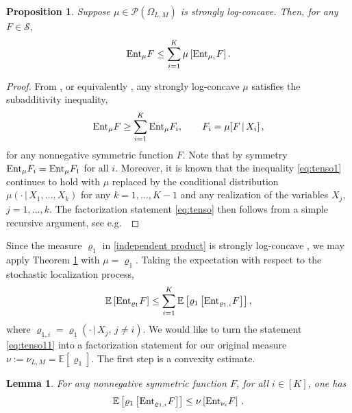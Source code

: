 \documentclass[11pt,reqno]{amsart}
\numberwithin{equation}{section}
\numberwithin{figure}{section}
\newtheorem{proposition}[theorem]{Proposition}
\newtheorem{lemma}[theorem]{Lemma}
\newcommand{\ent}{{\rm Ent}}
\newcommand{\1}{\mathds{1}}
\newcommand{\tc}{\,|\,}
\let\O=\Omega
\newcommand{\cP}{\ensuremath{\mathcal P}}
\newcommand{\cS}{\ensuremath{\mathcal S}}
\newcommand{\bbE}{{\ensuremath{\mathbb E}} }
\begin{document}
 \begin{proposition}\label{th:tenso}
 Suppose $\mu\in\cP(\O_{L,M})$ is strongly log-concave. Then, for any $F\in\cS$, 
   \begin{equation}\label{eq:tenso}
 \ent_\mu F\le \sum_{i=1}^K \mu\left[\ent_{\mu_i}F\right].
\end{equation}
 \end{proposition}
\begin{proof}
From \cite[Lemma 11]{CGM}, or equivalently \cite[Theorem 5]{EntInd22}, any strongly log-concave $\mu$ satisfies the subadditivity inequality, 
  \begin{equation}\label{eq:tenso1}
 \ent_\mu F\ge \sum_{i=1}^K \ent_\mu F_i,\qquad F_i = \mu[F\tc X_i]\,,
\end{equation}
for any nonnegative symmetric function $F$. Note that by symmetry $\ent_\mu F_i=\ent_\mu F_1$ for all $i$. Moreover, it is known that the inequality \eqref{eq:tenso1} continues to hold with $\mu$ replaced by the conditional distribution $\mu(\cdot\tc X_{1},\dots,X_{k})$ for any $k=1,\dots,K-1$ and any realization of the variables $X_j$, $j=1,\dots,k$. 
The factorization statement  \eqref{eq:tenso} then follows from a simple recursive argument, see e.g.\ \cite[Section 4.1]{EntLecNotes}
\end{proof}
Since the measure $\varrho_1$ in \eqref{independent product} is strongly log-concave \cite{borcea2009negative}, we may apply Theorem \ref{th:tenso} with $\mu=\varrho_1$. Taking the expectation with respect to the stochastic localization process, 
\begin{equation}\label{eq:tenso11}
\bbE \left[\ent_{\varrho_1}F\right] \le \sum_{i=1}^K \bbE\left[\varrho_1\left[\ent_{\varrho_{1,i}}F\right]\right],
\end{equation}
where $\varrho_{1,i}=\varrho_{1}(\cdot\tc X_j,\,j\neq i)$. 
We would like to turn the statement \eqref{eq:tenso11} into a factorization statement for our original measure $\nu:=\nu_{L,M}= \bbE[\varrho_1]$. 
The first step is a convexity estimate.
\begin{lemma}\label{lem:convex}
For any nonnegative symmetric function $F$, for all $i\in[K]$, one has
  \begin{equation}\label{eq:subma}
  \bbE\left[\varrho_1\left[\ent_{\varrho_{1,i}}F\right]\right]\le \nu\left[\ent_{\nu_i} F \right]\,.
\end{equation}
\end{lemma}
\end{document}
